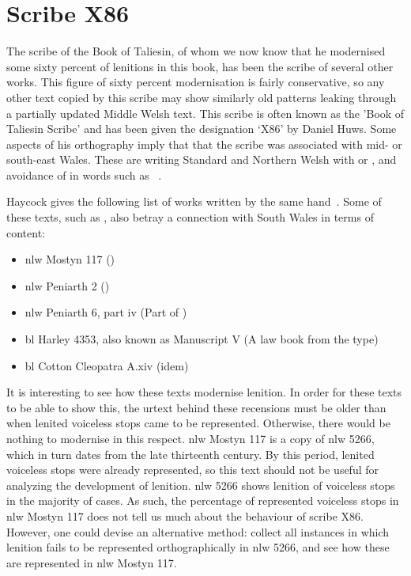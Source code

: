 \chapter{Scribe X86}
\label{cha:scribe-x86}
The scribe of the Book of Taliesin, of whom we now know that he modernised some sixty percent of lenitions in this book, has been the scribe of several other works. This figure of sixty percent modernisation is fairly conservative, so any other text copied by this scribe may show similarly old patterns leaking through a partially updated Middle Welsh text. This scribe is often known as the  'Book of Taliesin Scribe' and has been given the designation `X86' by Daniel Huws. Some aspects of his orthography imply that that the scribe was associated with mid- or south-east Wales. These are writing Standard and Northern Welsh  with  or , and avoidance of \mw{\ci} in words such as ~\autocite[2]{haycock_legendary_2015}.  

Haycock gives the following list of works written by the same hand~\autocite[2]{haycock_legendary_2015}. Some of these texts, such as , also betray a connection with South Wales in terms of content:

\begin{itemize}
    \item \gls{nlw} Mostyn 117 ()
    \item \gls{nlw} Peniarth 2 ()
    \item \gls{nlw} Peniarth 6, part iv (Part of )
    \item \gls{bl} Harley 4353, also known as Manuscript V (A law book from the  type)
    \item \gls{bl} Cotton Cleopatra A.xiv (idem)
\end{itemize}

It is interesting to see how these texts modernise lenition. In order for these texts to be able to show this, the urtext behind these recensions must be older than when lenited voiceless stops came to be represented. Otherwise, there would be nothing to modernise in this respect. \gls{nlw} Mostyn 117 is a copy of \gls{nlw} 5266, which in turn dates from the late thirteenth century. By this period, lenited voiceless stops were already represented, so this text should not be useful for analyzing the development of lenition. \gls{nlw} 5266 shows lenition of voiceless stops in the majority of cases. As such, the percentage of represented voiceless stops in \gls{nlw} Mostyn 117 does not tell us much about the behaviour of scribe X86. However, one could devise an alternative method: collect all instances in which lenition fails to be represented orthographically in \gls{nlw} 5266, and see how these are represented in \gls{nlw} Mostyn 117.

